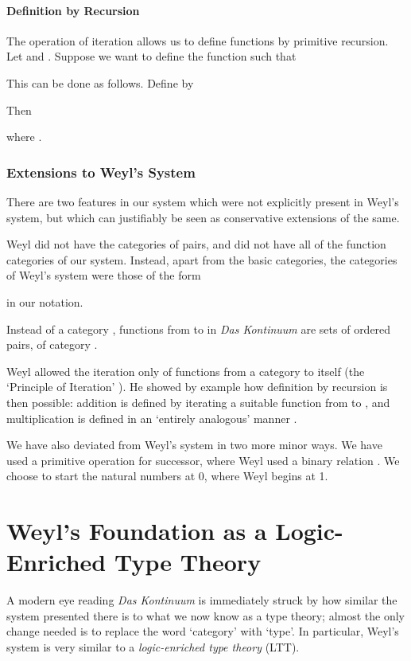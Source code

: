 \documentclass[acmtocl]{acmtrans2m}
\begin{document}
\paragraph{Definition by Recursion}
The operation of iteration allows us to define functions by primitive recursion.  Let  and .  Suppose we want to define the function  such that

This can be done as follows.  Define  by

Then

where .


\subsubsection{Extensions to Weyl's System}
\label{section:extension}
There are two features in our system which were not
explicitly present in Weyl's system, but which can justifiably be
seen as conservative extensions of the same.

Weyl did not have the categories  of pairs, and did not have all of the function categories  of our system.  Instead, apart from the basic categories, the categories of Weyl's system were those of the form

in our notation.

Instead of a category , functions from  to  in \emph{Das Kontinuum} are sets of ordered pairs, of category .

Weyl allowed the iteration only of functions from a category  to itself (the `Principle of Iteration' \cite[p.~36]{weyl:continuum}).  He showed by example how definition by recursion is then possible: addition is defined by iterating a suitable function from  to  \cite[p.~51]{weyl:continuum}, and multiplication is defined in an `entirely analogous' manner \cite[p.~53]{weyl:continuum}.

We have also deviated from Weyl's system in two more minor ways.  We have used a primitive operation  for successor, where Weyl used a binary relation .
We choose to start the natural numbers at 0, where Weyl begins at 1.

\section{Weyl's Foundation as a Logic-Enriched Type Theory}
\label{section:lett}

A modern eye reading \emph{Das Kontinuum}
is immediately struck by how similar the system presented there is to what we now know as
a type theory; almost the only change needed is to replace the word
`category' with `type'.  In particular, Weyl's system is very
similar to a \emph{logic-enriched type theory} (LTT).
\end{document}
